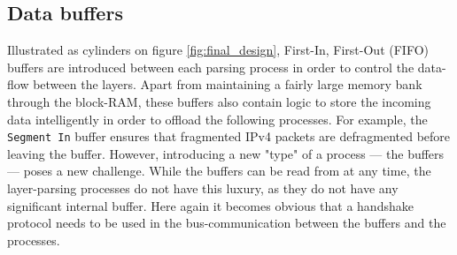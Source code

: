 \subsection{Data buffers} \label{sec:data_buffers}
Illustrated as cylinders on figure \ref{fig:final_design}, First-In, First-Out (FIFO)
buffers are introduced between each parsing process in order to control the data-flow
between the layers. Apart from maintaining a fairly large memory bank through
the block-RAM, these buffers also contain logic to store the incoming data
intelligently in order to offload the following processes. For example, the
\texttt{Segment In} buffer ensures that fragmented IPv4 packets are defragmented
before leaving the buffer.
However, introducing a new "type" of a process --- the buffers --- poses a new
challenge. While the buffers can be read from at any time, the layer-parsing
processes do not have this luxury, as they do not have any significant internal
buffer. Here again it becomes obvious that a handshake protocol needs to be used
in the bus-communication between the buffers and the processes.

